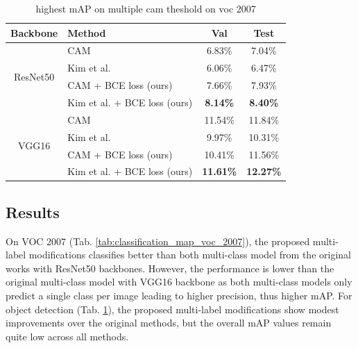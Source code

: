 \documentclass[conference]{IEEEtran}
\begin{document}
\begin{table}[t]
    \centering
    \caption{highest mAP on multiple cam theshold on voc 2007}
    \label{tab:brute_force_cam_threshold_map_voc_2007}
    \begin{tabular}{|c|l|c|c|}
        \hline
        Backbone                     & Method                                              & Val                             & Test                            \\
        \hline
        \multirow[c]{4}{*}{ResNet50} & CAM\cite{zhou2015cnnlocalization}                   & 6.83\%                          & 7.04\%                          \\
                                     & Kim et al. \cite{kim2022bridging}                   & 6.06\%                          & 6.47\%                          \\
                                     & CAM\cite{zhou2015cnnlocalization} + BCE loss (ours) & 7.66\%                          & 7.93\%                          \\
                                     & Kim et al. \cite{kim2022bridging} + BCE loss (ours) & \color{red} \bfseries{8.14\%}   & \color{red} \bfseries{8.40\%}   \\
        \hline
        \multirow[c]{4}{*}{VGG16}    & CAM\cite{zhou2015cnnlocalization}                   & 11.54\%                         & 11.84\%                         \\
                                     & Kim et al. \cite{kim2022bridging}                   & 9.97\%                          & 10.31\%                         \\
                                     & CAM\cite{zhou2015cnnlocalization} + BCE loss (ours) & 10.41\%                         & 11.56\%                         \\
                                     & Kim et al. \cite{kim2022bridging} + BCE loss (ours) & \color{blue} \bfseries{11.61\%} & \color{blue} \bfseries{12.27\%} \\
        \hline
    \end{tabular}
\end{table}



\subsection{Results}

On VOC 2007 (Tab. \ref{tab:classification_map_voc_2007}), the proposed multi-label modifications classifies better than both multi-class model from the original works \cite{zhou2015cnnlocalization} \cite{kim2022bridging} with ResNet50 backbones. However, the performance is lower than the original multi-class model with VGG16 backbone as both multi-class models only predict a single class per image leading to higher precision, thus higher mAP. For object detection (Tab. \ref{tab:brute_force_cam_threshold_map_voc_2007}), the proposed multi-label modifications show modest improvements over the original methods, but the overall mAP values remain quite low across all methods.
\end{document}
